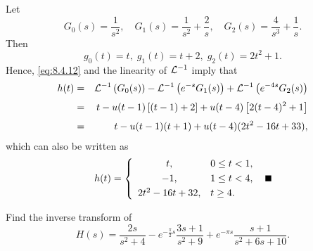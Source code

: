 \begin{examplesolution}
\solution Let
\[
  G_{0}(s)=\frac{1}{s^{2}},\quad G_{1}(s)=\frac{1}{s^{2}}+\frac{2}{s},\quad G_{2}(s)=\frac{4}{s^{3}}+\frac{1}{s}.
\]
Then
\[
  g_{0}(t)=t,\;g_{1}(t)=t+2,\;g_{2}(t)=2t^{2}+1.
\]
Hence, \eqref{eq:8.4.12} and the linearity of ${\cal L}^{-1}$ imply that
\begin{eqnarray*}
  h(t) & = & {\cal L}^{-1}\left(G_{0}(s)\right)-{\cal L}^{-1}\left(e^{-s}G_{1}(s)\right)+{\cal L}^{-1}\left(e^{-4s}G_{2}(s)\right) \\[1\jot]
       & = & t-u(t-1)\left[(t-1)+2\right]+u(t-4)\left[2(t-4)^{2}+1\right]                                                          \\[1\jot]
       & = & t-u(t-1)(t+1)+u(t-4)(2t^{2}-16t+33),
\end{eqnarray*}
which can also be written as
\[
  h(t)=\left\{
  \begin{array}{cl}
    t,             & 0\le t<1, \\[1\jot]
    -1,            & 1\le t<4, \\[1\jot]
    2t^{2}-16t+32, & t\ge4.
  \end{array}\right.\bbox
\]
\end{examplesolution}

\begin{example}
  \label{example:8.4.8}\rm Find the inverse transform of
  \[
    H(s)=\frac{2s}{s^{2}+4}-e^{-\frac{\pi}{2}s}\frac{3s+1}{s^{2}+9}+e^{-\pi s}\frac{s+1}{s^{2}+6s+10}.
  \]
\end{example}

